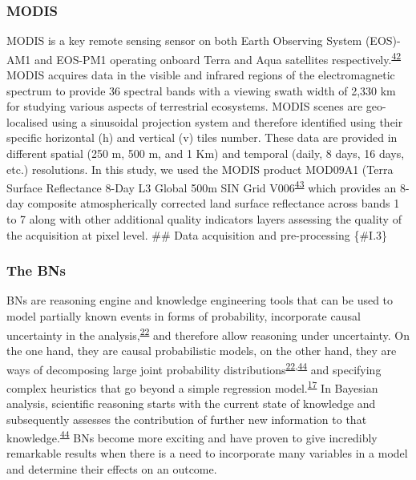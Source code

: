 \documentclass[12pt,oneside]{article}
\begin{document}
\hypertarget{I.2.2}{%
\subsubsection{MODIS}\label{I.2.2}}

MODIS is a key remote sensing sensor on both Earth Observing System
(EOS)-AM1 and EOS-PM1 operating onboard Terra and Aqua satellites
respectively.\textsuperscript{\protect\hyperlink{ref-King_et_al_1995}{42}}
MODIS acquires data in the visible and infrared regions of the
electromagnetic spectrum to provide 36 spectral bands with a viewing
swath width of 2,330 km for studying various aspects of terrestrial
ecosystems. MODIS scenes are geo-localised using a sinusoidal projection
system and therefore identified using their specific horizontal (h) and
vertical (v) tiles number. These data are provided in different spatial
(250 m, 500 m, and 1 Km) and temporal (daily, 8 days, 16 days, etc.)
resolutions. In this study, we used the MODIS product MOD09A1 (Terra
Surface Reflectance 8-Day L3 Global 500m SIN Grid
V006\textsuperscript{\protect\hyperlink{ref-Vermote_2015}{43}} which
provides an 8-day composite atmospherically corrected land surface
reflectance across bands 1 to 7 along with other additional quality
indicators layers assessing the quality of the acquisition at pixel
level. \#\# Data acquisition and pre-processing \{\#I.3\}

\hypertarget{I.3.1}{%
\subsubsection{The BNs}\label{I.3.1}}

BNs are reasoning engine and knowledge engineering tools that can be
used to model partially known events in forms of probability,
incorporate causal uncertainty in the
analysis,\textsuperscript{\protect\hyperlink{ref-Pourret_et_al_2008}{22}}
and therefore allow reasoning under uncertainty. On the one hand, they
are causal probabilistic models, on the other hand, they are ways of
decomposing large joint probability
distributions\textsuperscript{\protect\hyperlink{ref-Pourret_et_al_2008}{22},\protect\hyperlink{ref-Pearl_2000}{44}}
and specifying complex heuristics that go beyond a simple regression
model.\textsuperscript{\protect\hyperlink{ref-Whitney_et_al_2018}{17}}
In Bayesian analysis, scientific reasoning starts with the current state
of knowledge and subsequently assesses the contribution of further new
information to that
knowledge.\textsuperscript{\protect\hyperlink{ref-Pearl_2000}{44}} BNs
become more exciting and have proven to give incredibly remarkable
results when there is a need to incorporate many variables in a model
and determine their effects on an outcome.
\end{document}
